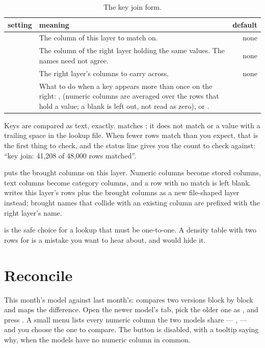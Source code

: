 \begin{table}[htbp]\small
\begin{tabularx}{\linewidth}{@{}lMD@{}}\toprule
setting & meaning & default \\ \midrule
{} & The column of this layer to match on. & none \\
 & The column of the right layer holding the same values. The names need not agree. & none \\
 & The right layer's columns to carry across. & none \\
 & What to do when a key appears more than once on the right: ,  (numeric columns are averaged over the rows that hold a value; a blank is left out, not read as zero), or . &  \\ \bottomrule
\end{tabularx}
\caption{The key join form.}\label{tab:joins-key}
\end{table}

Keys are compared as text, exactly.  matches ; it does not match  or a value with a trailing space in the lookup file. When fewer rows match than you expect, that is the first thing to check, and the status line gives you the count to check against: “key join: 41,208 of 48,000 rows matched”.

 puts the brought columns on this layer. Numeric columns become stored columns, text columns become category columns, and a row with no match is left blank.  writes this layer's rows plus the brought columns as a new file-shaped layer instead; brought names that collide with an existing column are prefixed with the right layer's name.

\begin{tip}
 is the safe choice for a lookup that must be one-to-one. A density table with two rows for  is a mistake you want to hear about, and  would hide it.
\end{tip}

\section{Reconcile}\label{sec:joins-reconcile}

This month's model against last month's:  compares two versions block by block and maps the difference. Open the newer model's  tab, pick the older one as , and press . A small menu lists every numeric column the two models share — ,  — and you choose the one to compare. The button is disabled, with a tooltip saying why, when the models have no numeric column in common.

